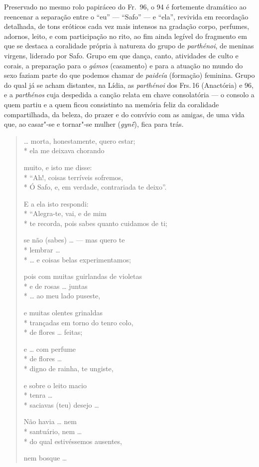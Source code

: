{\small Preservado no mesmo rolo papiráceo do Fr.~96, o 94 é fortemente dramático ao
reencenar a separação entre o “eu” --- ``Safo” --- e “ela”, revivida em
recordação detalhada, de tons eróticos cada vez mais intensos na
gradação corpo, perfumes, adornos, leito, e com participação no rito,
ao fim ainda legível do fragmento em que se destaca a coralidade própria à natureza do grupo de \textit{parthénoi}, de meninas virgens, liderado por Safo. Grupo em que dança, canto, atividades de culto e corais, a preparação para o \textit{gámos} (casamento) e para a atuação no mundo do sexo faziam parte do que podemos chamar de \textit{paideía} (formação) feminina. Grupo do qual já se acham distantes, na Lídia, as \textit{parthénoi} dos Frs.\,16 (Anactória) e 96, e a \textit{parthénos} cuja despedida a canção relata em chave consolatória --- o consolo a quem partiu e a quem ficou consistinto na memória feliz da coralidade compartilhada, da beleza, do prazer e do convívio com as amigas, de uma vida que, ao casar"-se e tornar"-se mulher (\textit{gynḗ}), fica para trás.}

\begin{verse}
\ldots{} morta, honestamente, quero estar;\\*
ela me deixava chorando

muito, e isto me disse:\\*
“Ah!, coisas terríveis sofremos,\\*
Ó Safo, e, em verdade, contrariada te deixo”.

E a ela isto respondi:\\*
“Alegra-te, vai, e de mim\\*
te recorda, pois sabes quanto cuidamos de ti;

se não (sabes) \ldots{} --- mas quero te\\*
lembrar \ldots{}\\*
\ldots{} e coisas belas experimentamos;

pois com muitas guirlandas de violetas\\*
e de rosas \ldots{} juntas\\*
\ldots{} ao meu lado puseste,			%

e muitas olentes grinaldas\\*
trançadas em torno do tenro colo, \\*
de flores \ldots{} feitas;

e \ldots{} com perfume\\*
de flores \ldots{}\\*
digno de rainha, te ungiste,

e sobre o leito macio\\*
tenra \ldots{}\\*
saciavas (teu) desejo \ldots{}

Não havia \ldots{} nem \\*
santuário, nem \ldots{}\\*
do qual estivéssemos ausentes,

nem bosque \ldots{}
\end{verse}


